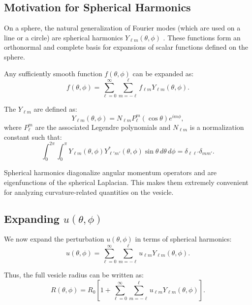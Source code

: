 \documentclass[12pt,a4paper]{article}
\begin{document}
\subsection{Motivation for Spherical Harmonics}

On a sphere, the natural generalization of Fourier modes (which are used on a line or a circle) are spherical harmonics $Y_{\ell m}(\theta,\phi)$ \cite{Jackson1999,Arfken}. These functions form an orthonormal and complete basis for expansions of scalar functions defined on the sphere.

Any sufficiently smooth function $f(\theta,\phi)$ can be expanded as:
\begin{equation}
f(\theta,\phi) = \sum_{\ell=0}^{\infty}\sum_{m=-\ell}^{\ell} f_{\ell m} Y_{\ell m}(\theta,\phi).
\end{equation}

The $Y_{\ell m}$ are defined as:
\begin{equation}
Y_{\ell m}(\theta,\phi) = N_{\ell m} P_{\ell}^{m}(\cos\theta)e^{i m \phi},
\end{equation}
where $P_{\ell}^{m}$ are the associated Legendre polynomials and $N_{\ell m}$ is a normalization constant such that:
\begin{equation}
\int_0^{2\pi}\int_0^{\pi} Y_{\ell m}(\theta,\phi) Y_{\ell' m'}^*(\theta,\phi)\sin\theta\,d\theta\,d\phi = \delta_{\ell\ell'} \delta_{mm'}.
\end{equation}

Spherical harmonics diagonalize angular momentum operators and are eigenfunctions of the spherical Laplacian. This makes them extremely convenient for analyzing curvature-related quantities on the vesicle.

\subsection{Expanding $u(\theta,\phi)$}

We now expand the perturbation $u(\theta,\phi)$ in terms of spherical harmonics:
\begin{equation}
u(\theta,\phi) = \sum_{\ell=0}^{\infty}\sum_{m=-\ell}^{\ell} u_{\ell m} Y_{\ell m}(\theta,\phi).
\end{equation}

Thus, the full vesicle radius can be written as:
\begin{equation}
R(\theta,\phi) = R_0 \left[1 + \sum_{\ell=0}^{\infty}\sum_{m=-\ell}^{\ell} u_{\ell m} Y_{\ell m}(\theta,\phi)\right].
\end{equation}
\end{document}
